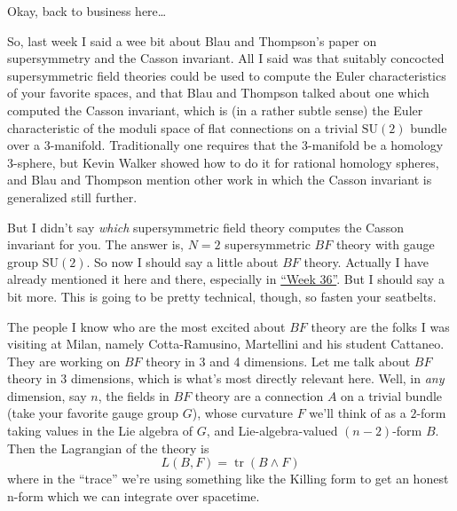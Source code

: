 \documentclass{article}
\renewcommand{\texttt}[1]{%
  \begingroup
  \ttfamily
  \begingroup\lccode`~=`/\lowercase{\endgroup\def~}{/\discretionary{}{}{}}%
  \begingroup\lccode`~=`[\lowercase{\endgroup\def~}{[\discretionary{}{}{}}%
  \begingroup\lccode`~=`.\lowercase{\endgroup\def~}{.\discretionary{}{}{}}%
  \catcode`/=\active\catcode`[=\active\catcode`.=\active
  \scantokens{#1\noexpand}%
  \endgroup
}
\begin{document}
Okay, back to business here\ldots{}


So, last week I said a wee bit about Blau and Thompson's paper on
supersymmetry and the Casson invariant. All I said was that suitably
concocted supersymmetric field theories could be used to compute the
Euler characteristics of your favorite spaces, and that Blau and
Thompson talked about one which computed the Casson invariant, which is
(in a rather subtle sense) the Euler characteristic of the moduli space
of flat connections on a trivial \(\mathrm{SU}(2)\) bundle over a
3-manifold. Traditionally one requires that the 3-manifold be a homology
3-sphere, but Kevin Walker showed how to do it for rational homology
spheres, and Blau and Thompson mention other work in which the Casson
invariant is generalized still further.

But I didn't say \emph{which} supersymmetric field theory computes the
Casson invariant for you. The answer is, \(N = 2\) supersymmetric \(BF\)
theory with gauge group \(\mathrm{SU}(2)\). So now I should say a little
about \(BF\) theory. Actually I have already mentioned it here and
there, especially in \protect\hyperlink{week36}{``Week 36''}. But I
should say a bit more. This is going to be pretty technical, though, so
fasten your seatbelts.

The people I know who are the most excited about \(BF\) theory are the
folks I was visiting at Milan, namely Cotta-Ramusino, Martellini and his
student Cattaneo. They are working on \(BF\) theory in 3 and 4
dimensions. Let me talk about \(BF\) theory in 3 dimensions, which is
what's most directly relevant here. Well, in \emph{any} dimension, say
\(n\), the fields in \(BF\) theory are a connection \(A\) on a trivial
bundle (take your favorite gauge group \(G\)), whose curvature \(F\)
we'll think of as a \(2\)-form taking values in the Lie algebra of
\(G\), and Lie-algebra-valued \((n-2)\)-form \(B\). Then the Lagrangian
of the theory is \[L(B,F) = \operatorname{tr}(B \wedge F)\] where in the
``trace'' we're using something like the Killing form to get an honest
n-form which we can integrate over spacetime.
\end{document}
